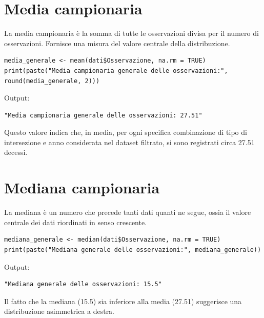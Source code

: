 \documentclass[14pt, openany, titlepage]{report} %
\begin{document}
\section{Media campionaria}
La media campionaria è la somma di tutte le osservazioni divisa per il numero di osservazioni.
 Fornisce una misura del valore centrale della distribuzione.
\begin{center}
\begin{lstlisting}[breaklines=true]
media_generale <- mean(dati$Osservazione, na.rm = TRUE)
print(paste("Media campionaria generale delle osservazioni:", round(media_generale, 2)))
\end{lstlisting}  
\end{center}
\noindent
Output: 
\begin{verbatim}
"Media campionaria generale delle osservazioni: 27.51"
\end{verbatim}
Questo valore indica che, in media, per ogni specifica combinazione di tipo di intersezione e anno considerata nel dataset filtrato, si sono registrati circa 27.51 decessi.

\section{Mediana campionaria}
La mediana è un numero che precede tanti dati quanti ne segue, ossia il 
valore centrale dei dati riordinati in senso crescente.
\begin{center}
\begin{lstlisting}[breaklines=true]
mediana_generale <- median(dati$Osservazione, na.rm = TRUE)
print(paste("Mediana generale delle osservazioni:", mediana_generale))
\end{lstlisting}  
\end{center}
\noindent
Output:
\begin{verbatim}
"Mediana generale delle osservazioni: 15.5"
\end{verbatim}
 Il fatto che la mediana (15.5)
 sia inferiore alla media (27.51) suggerisce una distribuzione 
 asimmetrica a destra.
\end{document}
